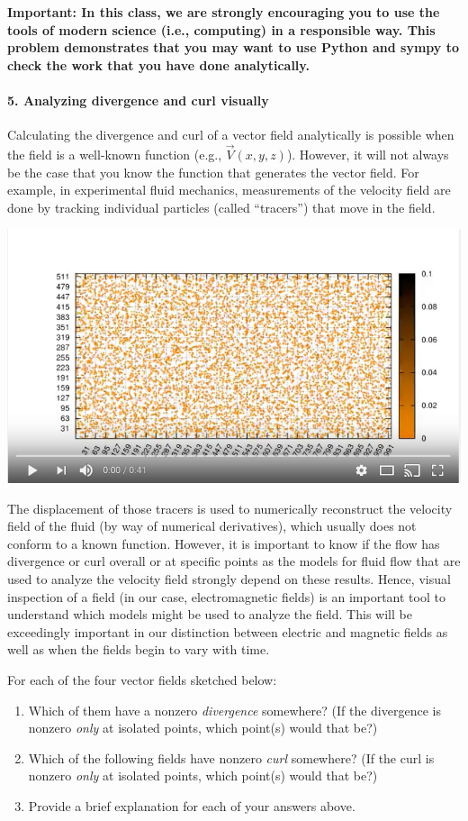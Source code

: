 \documentclass[11pt]{article}
\def\tightlist{}
\begin{document}
\textbf{Important: In this class, we are strongly encouraging you to use
the tools of modern science (i.e., computing) in a responsible way. This
problem demonstrates that you may want to use Python and sympy to check
the work that you have done analytically.}

\paragraph{5. Analyzing divergence and curl
visually}\label{analyzing-divergence-and-curl-visually}

Calculating the divergence and curl of a vector field analytically is
possible when the field is a well-known function (e.g.,
\(\vec{V}(x,y,z)\)). However, it will not always be the case that you
know the function that generates the vector field. For example, in
experimental fluid mechanics, measurements of the velocity field are
done by tracking individual particles (called ``tracers'') that move in
the field.

\href{https://www.youtube.com/watch?v=hzvFHrWQbP0}{\includegraphics[width=0.6\linewidth]{./images/hw1/tracers.png}}

The displacement of those tracers is used to numerically reconstruct the
velocity field of the fluid (by way of numerical derivatives), which
usually does not conform to a known function. However, it is important
to know if the flow has divergence or curl overall or at specific points
as the models for fluid flow that are used to analyze the velocity field
strongly depend on these results. Hence, visual inspection of a field
(in our case, electromagnetic fields) is an important tool to understand
which models might be used to analyze the field. This will be
exceedingly important in our distinction between electric and magnetic
fields as well as when the fields begin to vary with time.

For each of the four vector fields sketched below:

\begin{enumerate}
\def\labelenumi{\arabic{enumi}.}
\tightlist
\item
  Which of them have a nonzero \emph{divergence} somewhere? (If the
  divergence is nonzero \emph{only} at isolated points, which point(s)
  would that be?)
\item
  Which of the following fields have nonzero \emph{curl} somewhere? (If
  the curl is nonzero \emph{only} at isolated points, which point(s)
  would that be?)
\item
  Provide a brief explanation for each of your answers above.
\end{enumerate}
\end{document}
